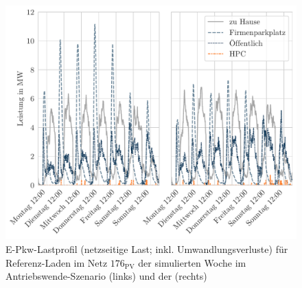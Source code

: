 \begin{figure}[H]
    \centering
    \includegraphics[width=\textwidth]{Bilder/example_load_profile}
    \caption[E-Pkw-Lastprofil für Referenz-Laden im Netz \num{176} der simulierten Woche im Antriebswende-Szenario und der Sensitivität Firmenparkplatz]{E-Pkw-Lastprofil (netzseitige Last; inkl. Umwandlungsverluste) für Referenz-Laden im Netz \(176_{\text{PV}}\) der simulierten Woche im Antriebswende-Szenario (links) und der \SzeFirmenparkplatz (rechts)}\label{fig:example_load_profile}
\end{figure}